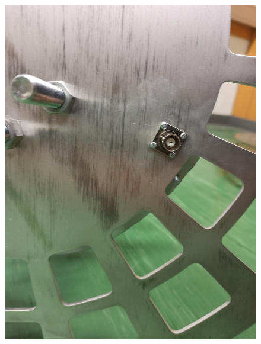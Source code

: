 \begin{figure}[h!]
	\begin{minipage}[b]{.4\linewidth} %
		\includegraphics{../ref/BNC-Buchse.jpg}
		\label{fig:BNC-Buchse}
	\end{minipage}
	\hspace{.1\linewidth}%
	\begin{minipage}[b]{.4\linewidth} %

\end{minipage}
\end{figure}
